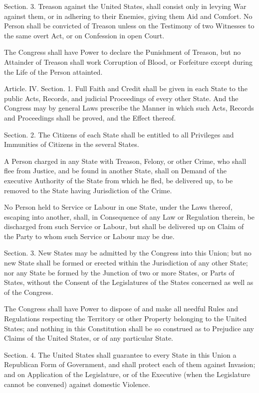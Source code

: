 \documentclass{article}
\begin{document}
Section. 3.  Treason against the United States, shall consist only in levying
War against them, or in adhering to their Enemies, giving them Aid and Comfort.
No Person shall be convicted of Treason unless on the Testimony of two Witnesses
to the same overt Act, or on Confession in open Court.

The Congress shall have Power to declare the Punishment of Treason, but no
Attainder of Treason shall work Corruption of Blood, or Forfeiture except during
the Life of the Person attainted.


Article. IV.  Section. 1.  Full Faith and Credit shall be given in each State to
the public Acts, Records, and judicial Proceedings of every other State. And the
Congress may by general Laws prescribe the Manner in which such Acts, Records
and Proceedings shall be proved, and the Effect thereof.


Section. 2.  The Citizens of each State shall be entitled to all Privileges and
Immunities of Citizens in the several States.

A Person charged in any State with Treason, Felony, or other Crime, who shall
flee from Justice, and be found in another State, shall on Demand of the
executive Authority of the State from which he fled, be delivered up, to be
removed to the State having Jurisdiction of the Crime.

No Person held to Service or Labour in one State, under the Laws thereof,
escaping into another, shall, in Consequence of any Law or Regulation therein,
be discharged from such Service or Labour, but shall be delivered up on Claim of
the Party to whom such Service or Labour may be due.


Section. 3.  New States may be admitted by the Congress into this Union; but no
new State shall be formed or erected within the Jurisdiction of any other State;
nor any State be formed by the Junction of two or more States, or Parts of
States, without the Consent of the Legislatures of the States concerned as well
as of the Congress.

The Congress shall have Power to dispose of and make all needful Rules and
Regulations respecting the Territory or other Property belonging to the United
States; and nothing in this Constitution shall be so construed as to Prejudice
any Claims of the United States, or of any particular State.


Section. 4.  The United States shall guarantee to every State in this Union a
Republican Form of Government, and shall protect each of them against Invasion;
and on Application of the Legislature, or of the Executive (when the Legislature
cannot be convened) against domestic Violence.
\end{document}
